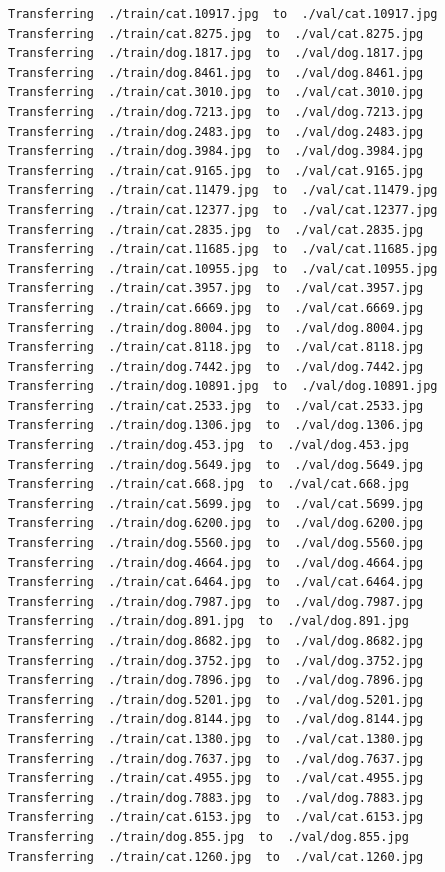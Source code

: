 \documentclass[]{book}
\theoremstyle{definition}
\theoremstyle{definition}
\theoremstyle{definition}
\theoremstyle{remark}
\begin{document}
\begin{verbatim}
Transferring  ./train/cat.10917.jpg  to  ./val/cat.10917.jpg
Transferring  ./train/cat.8275.jpg  to  ./val/cat.8275.jpg
Transferring  ./train/dog.1817.jpg  to  ./val/dog.1817.jpg
Transferring  ./train/dog.8461.jpg  to  ./val/dog.8461.jpg
Transferring  ./train/cat.3010.jpg  to  ./val/cat.3010.jpg
Transferring  ./train/dog.7213.jpg  to  ./val/dog.7213.jpg
Transferring  ./train/dog.2483.jpg  to  ./val/dog.2483.jpg
Transferring  ./train/dog.3984.jpg  to  ./val/dog.3984.jpg
Transferring  ./train/cat.9165.jpg  to  ./val/cat.9165.jpg
Transferring  ./train/cat.11479.jpg  to  ./val/cat.11479.jpg
Transferring  ./train/cat.12377.jpg  to  ./val/cat.12377.jpg
Transferring  ./train/cat.2835.jpg  to  ./val/cat.2835.jpg
Transferring  ./train/cat.11685.jpg  to  ./val/cat.11685.jpg
Transferring  ./train/cat.10955.jpg  to  ./val/cat.10955.jpg
Transferring  ./train/cat.3957.jpg  to  ./val/cat.3957.jpg
Transferring  ./train/cat.6669.jpg  to  ./val/cat.6669.jpg
Transferring  ./train/dog.8004.jpg  to  ./val/dog.8004.jpg
Transferring  ./train/cat.8118.jpg  to  ./val/cat.8118.jpg
Transferring  ./train/dog.7442.jpg  to  ./val/dog.7442.jpg
Transferring  ./train/dog.10891.jpg  to  ./val/dog.10891.jpg
Transferring  ./train/cat.2533.jpg  to  ./val/cat.2533.jpg
Transferring  ./train/dog.1306.jpg  to  ./val/dog.1306.jpg
Transferring  ./train/dog.453.jpg  to  ./val/dog.453.jpg
Transferring  ./train/dog.5649.jpg  to  ./val/dog.5649.jpg
Transferring  ./train/cat.668.jpg  to  ./val/cat.668.jpg
Transferring  ./train/cat.5699.jpg  to  ./val/cat.5699.jpg
Transferring  ./train/dog.6200.jpg  to  ./val/dog.6200.jpg
Transferring  ./train/dog.5560.jpg  to  ./val/dog.5560.jpg
Transferring  ./train/dog.4664.jpg  to  ./val/dog.4664.jpg
Transferring  ./train/cat.6464.jpg  to  ./val/cat.6464.jpg
Transferring  ./train/dog.7987.jpg  to  ./val/dog.7987.jpg
Transferring  ./train/dog.891.jpg  to  ./val/dog.891.jpg
Transferring  ./train/dog.8682.jpg  to  ./val/dog.8682.jpg
Transferring  ./train/dog.3752.jpg  to  ./val/dog.3752.jpg
Transferring  ./train/dog.7896.jpg  to  ./val/dog.7896.jpg
Transferring  ./train/dog.5201.jpg  to  ./val/dog.5201.jpg
Transferring  ./train/dog.8144.jpg  to  ./val/dog.8144.jpg
Transferring  ./train/cat.1380.jpg  to  ./val/cat.1380.jpg
Transferring  ./train/dog.7637.jpg  to  ./val/dog.7637.jpg
Transferring  ./train/cat.4955.jpg  to  ./val/cat.4955.jpg
Transferring  ./train/dog.7883.jpg  to  ./val/dog.7883.jpg
Transferring  ./train/cat.6153.jpg  to  ./val/cat.6153.jpg
Transferring  ./train/dog.855.jpg  to  ./val/dog.855.jpg
Transferring  ./train/cat.1260.jpg  to  ./val/cat.1260.jpg

\end{verbatim}
\end{document}
